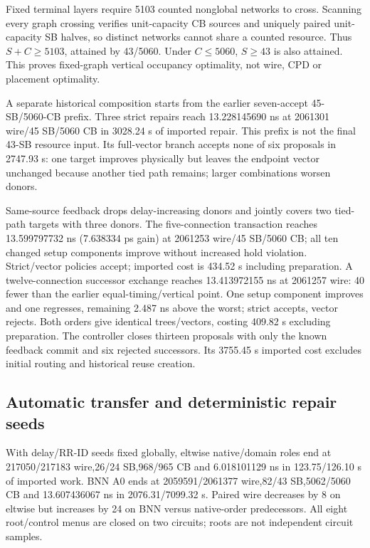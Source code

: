 \documentclass[conference,10pt]{IEEEtran}
\begin{document}
Fixed terminal layers require 5103 counted nonglobal networks to cross. Scanning every graph crossing verifies unit-capacity CB sources and uniquely paired unit-capacity SB halves, so distinct networks cannot share a counted resource. Thus $S+C\ge5103$, attained by 43/5060. Under $C\le5060$, $S\ge43$ is also attained. This proves fixed-graph vertical occupancy optimality, not wire, CPD or placement optimality.

A separate historical composition starts from the earlier seven-accept 45-SB/5060-CB prefix. Three strict repairs reach 13.228145690 ns at 2061301 wire/45 SB/5060 CB in 3028.24 s of imported repair. This prefix is not the final 43-SB resource input. Its full-vector branch accepts none of six proposals in 2747.93 s: one target improves physically but leaves the endpoint vector unchanged because another tied path remains; larger combinations worsen donors.

Same-source feedback drops delay-increasing donors and jointly covers two tied-path targets with three donors. The five-connection transaction reaches 13.599797732 ns (7.638334 ps gain) at 2061253 wire/45 SB/5060 CB; all ten changed setup components improve without increased hold violation. Strict/vector policies accept; imported cost is 434.52 s including preparation. A twelve-connection successor exchange reaches 13.413972155 ns at 2061257 wire: 40 fewer than the earlier equal-timing/vertical point. One setup component improves and one regresses, remaining 2.487 ns above the worst; strict accepts, vector rejects. Both orders give identical trees/vectors, costing 409.82 s excluding preparation. The controller closes thirteen proposals with only the known feedback commit and six rejected successors. Its 3755.45 s imported cost excludes initial routing and historical reuse creation.

\subsection{Automatic transfer and deterministic repair seeds}
With delay/RR-ID seeds fixed globally, eltwise native/domain roles end at 217050/217183 wire,26/24 SB,968/965 CB and 6.018101129 ns in 123.75/126.10 s of imported work. BNN A0 ends at 2059591/2061377 wire,82/43 SB,5062/5060 CB and 13.607436067 ns in 2076.31/7099.32 s. Paired wire decreases by 8 on eltwise but increases by 24 on BNN versus native-order predecessors. All eight root/control menus are closed on two circuits; roots are not independent circuit samples.
\end{document}
